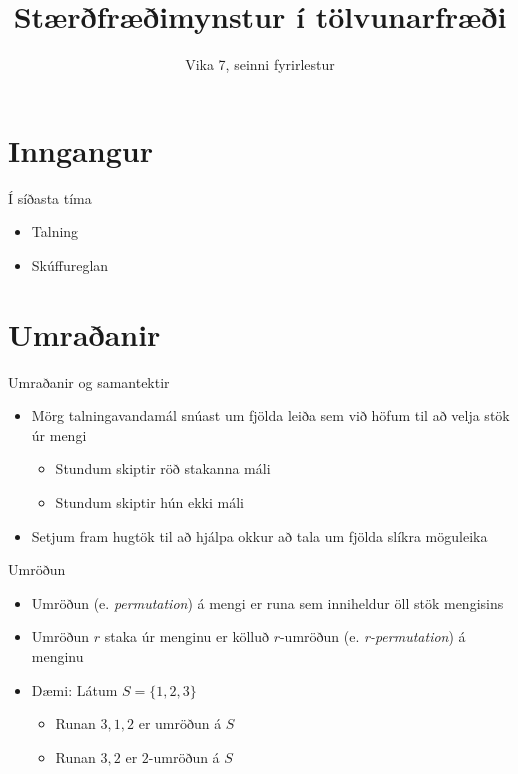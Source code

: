 \documentclass{beamer}
\title{Stærðfræðimynstur í tölvunarfræði}
\subtitle{Vika 7, seinni fyrirlestur}
\begin{document}
\begin{frame}
\titlepage
\end{frame}


\section{Inngangur}

\begin{frame}{Í síðasta tíma}
\begin{itemize}
 \item Talning
 \item Skúffureglan
\end{itemize}
\end{frame}

\section{Umraðanir}

\begin{frame}{Umraðanir og samantektir}
\begin{itemize}
 \item Mörg talningavandamál snúast um fjölda leiða sem við höfum til að velja stök úr mengi
 \begin{itemize}
  \item Stundum skiptir röð stakanna máli
  \item Stundum skiptir hún ekki máli
 \end{itemize}
 \item Setjum fram hugtök til að hjálpa okkur að tala um fjölda slíkra möguleika
\end{itemize}
\end{frame}

\begin{frame}{Umröðun}
\begin{itemize}
 \item Umröðun (e. \emph{permutation}) á mengi er runa sem inniheldur öll stök mengisins
 \item Umröðun $r$ staka úr menginu er kölluð $r$-umröðun (e. \emph{r-permutation}) á menginu
 \item Dæmi: Látum $S = \{1, 2, 3\}$
 \begin{itemize}
  \item Runan $3, 1, 2$ er umröðun á $S$
  \item Runan $3, 2$ er $2$-umröðun á $S$
 \end{itemize}
\end{itemize}
\end{frame}
\end{document}
